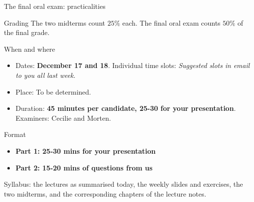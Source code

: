 \documentclass[aspectratio=169,10pt]{beamer}
\begin{document}
\begin{frame}[shrink=13]{The final oral exam: practicalities}
\small
\begin{block}{Grading}
The two midterms count $25\%$ each. The final oral exam counts $50\%$ of the final grade.
\end{block}
\begin{block}{When and where}
\begin{itemize}
\item Dates: \textbf{December 17 and 18}. Individual time slots: {\em Suggested slots in email to you all last week}.
\item Place: To be determined.
\item Duration: \textbf{45 minutes per candidate, 25-30 for your presentation}. Examiners: Cecilie and Morten.
\end{itemize}
\end{block}
\begin{block}{Format} 
\begin{itemize}
\item \textbf{Part 1: 25-30 mins for your presentation}
\item \textbf{Part 2: 15-20 mins of questions from us}
\end{itemize}
\end{block}
Syllabus: the lectures as summarised today, the weekly slides and exercises, the two midterms, and the corresponding chapters of the lecture notes.
\end{frame}
\end{document}
